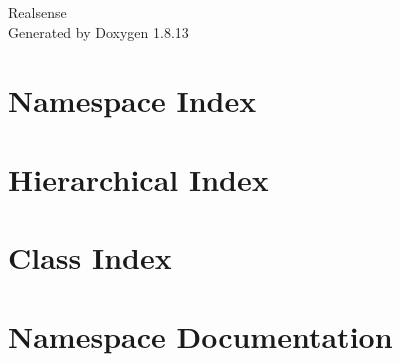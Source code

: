 \documentclass[twoside]{book}
\newcommand{\+}{\discretionary{\mbox{\scriptsize$\hookleftarrow$}}{}{}}
\newcommand{\clearemptydoublepage}{%
  \newpage{\pagestyle{empty}\cleardoublepage}%
}
\begin{document}
\begin{titlepage}
\vspace*{7cm}
\begin{center}%
{\Large Realsense }\\
\vspace*{1cm}
{\large Generated by Doxygen 1.8.13}\\
\end{center}
\end{titlepage}
\clearemptydoublepage
{}
\tableofcontents
\clearemptydoublepage
{}

\chapter{Namespace Index}

\chapter{Hierarchical Index}

\chapter{Class Index}

\chapter{Namespace Documentation}



\end{document}
